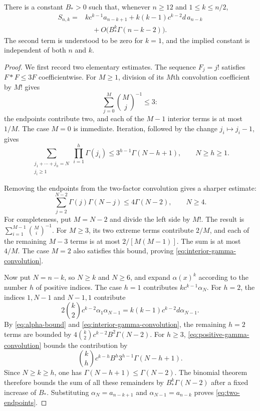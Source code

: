 \begin{lemma}\label{lem:second-endpoint}
There is a constant $B_*>0$ such that, whenever $n\ge12$ and
$1\le k\le n/2$,
\begin{equation}\label{eq:two-endpoints}
 \begin{split}
 S_{n,k}={}&kc^{k-1}a_{n-k+1}
       +k(k-1)c^{k-2}d\,a_{n-k}\\
       &\quad+O\bigl(B_*^k\Gamma(n-k-2)\bigr).
 \end{split}
\end{equation}
The second term is understood to be zero for $k=1$, and the implied
constant is independent of both $n$ and $k$.
\end{lemma}
\begin{proof}
We first record two elementary estimates. The sequence $F_j=j!$ satisfies
$F*F\le3F$ coefficientwise. For $M\ge1$, division of its $M$th convolution
coefficient by $M!$ gives
\[
 \sum_{j=0}^{M}\binom{M}{j}^{-1}\le3:
\]
the endpoints contribute two, and each of the $M-1$ interior terms is at
most $1/M$. The case $M=0$ is immediate. Iteration, followed by the change
$j_i\mapsto j_i-1$, gives
\begin{equation}\label{eq:positive-gamma-convolution}
 \sum_{\substack{j_1+\cdots+j_h=N\\j_i\ge1}}
       \prod_{i=1}^{h}\Gamma(j_i)
 \le3^{h-1}\Gamma(N-h+1),\qquad N\ge h\ge1.
\end{equation}

Removing the endpoints from the two-factor convolution gives a sharper
estimate:
\begin{equation}\label{eq:interior-gamma-convolution}
 \sum_{j=2}^{N-2}\Gamma(j)\Gamma(N-j)
       \le4\Gamma(N-2),\qquad N\ge4.
\end{equation}
For completeness, put $M=N-2$ and divide the left side by $M!$. The
result is $\sum_{i=1}^{M-1}\binom{M}{i}^{-1}$. For $M\ge3$, its two extreme
terms contribute $2/M$, and each of the remaining $M-3$ terms is at most
$2/[M(M-1)]$. The sum is at most $4/M$. The case $M=2$ also satisfies this
bound, proving \eqref{eq:interior-gamma-convolution}.

Now put $N=n-k$, so $N\ge k$ and $N\ge6$, and expand $\alpha(x)^k$
according to the number $h$ of positive indices. The case $h=1$ contributes
$kc^{k-1}\alpha_N$. For $h=2$, the indices $1,N-1$ and $N-1,1$ contribute
\[
 2\binom{k}{2}c^{k-2}\alpha_1\alpha_{N-1}
       =k(k-1)c^{k-2}d\alpha_{N-1}.
\]
By \eqref{eq:alpha-bound} and \eqref{eq:interior-gamma-convolution}, the
remaining $h=2$ terms are bounded by
$4\binom{k}{2}c^{k-2}B^2\Gamma(N-2)$.
For $h\ge3$, \eqref{eq:positive-gamma-convolution} bounds the contribution
by
\[
 \binom{k}{h}c^{k-h}B^h3^{h-1}\Gamma(N-h+1).
\]
Since $N\ge k\ge h$, one has
$\Gamma(N-h+1)\le\Gamma(N-2)$. The binomial theorem therefore bounds
the sum of all these remainders by $B_*^k\Gamma(N-2)$ after a fixed
increase of $B_*$. Substituting $\alpha_N=a_{n-k+1}$ and
$\alpha_{N-1}=a_{n-k}$ proves \eqref{eq:two-endpoints}.
\end{proof}

